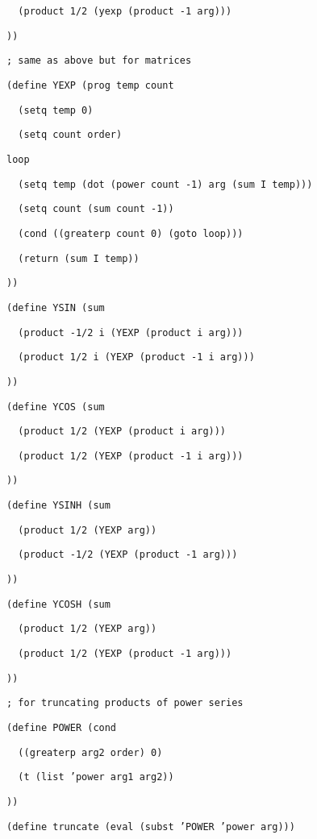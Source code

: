 {\tt \ \ (product\ 1/2\ (yexp\ (product\ -1\ arg)))}

{\tt ))}

{\tt ;\ same\ as\ above\ but\ for\ matrices}

{\tt (define\ YEXP\ (prog\ temp\ count}

{\tt \ \ (setq\ temp\ 0)}

{\tt \ \ (setq\ count\ order)}

{\tt loop}

{\tt \ \ (setq\ temp\ (dot\ (power\ count\ -1)\ arg\ (sum\ I\ temp)))}

{\tt \ \ (setq\ count\ (sum\ count\ -1))}

{\tt \ \ (cond\ ((greaterp\ count\ 0)\ (goto\ loop)))}

{\tt \ \ (return\ (sum\ I\ temp))}

{\tt ))}

{\tt (define\ YSIN\ (sum}

{\tt \ \ (product\ -1/2\ i\ (YEXP\ (product\ i\ arg)))}

{\tt \ \ (product\ 1/2\ i\ (YEXP\ (product\ -1\ i\ arg)))}

{\tt ))}

{\tt (define\ YCOS\ (sum}

{\tt \ \ (product\ 1/2\ (YEXP\ (product\ i\ arg)))}

{\tt \ \ (product\ 1/2\ (YEXP\ (product\ -1\ i\ arg)))}

{\tt ))}

{\tt (define\ YSINH\ (sum}

{\tt \ \ (product\ 1/2\ (YEXP\ arg))}

{\tt \ \ (product\ -1/2\ (YEXP\ (product\ -1\ arg)))}

{\tt ))}

{\tt (define\ YCOSH\ (sum}

{\tt \ \ (product\ 1/2\ (YEXP\ arg))}

{\tt \ \ (product\ 1/2\ (YEXP\ (product\ -1\ arg)))}

{\tt ))}

{\tt ;\ for\ truncating\ products\ of\ power\ series}

{\tt (define\ POWER\ (cond}

{\tt \ \ ((greaterp\ arg2\ order)\ 0)}

{\tt \ \ (t\ (list\ 'power\ arg1\ arg2))}

{\tt ))}

{\tt (define\ truncate\ (eval\ (subst\ 'POWER\ 'power\ arg)))}

